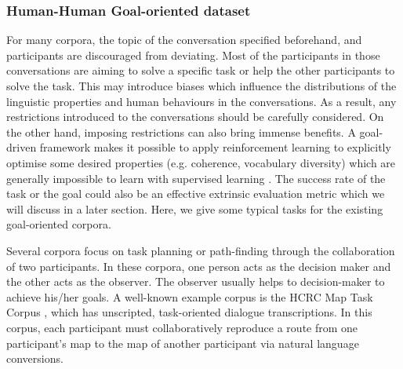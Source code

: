 \documentclass[bsc,frontabs,twoside,singlespacing,parskip,deptreport]{infthesis}     %
\begin{document}




\subsubsection*{Human-Human Goal-oriented dataset}

For many corpora, the topic of the conversation specified beforehand, and participants are discouraged from deviating. Most of the participants in those conversations are aiming to solve a specific task or help the other participants to solve the task. This may introduce biases which influence the distributions of the linguistic properties and human behaviours in the conversations. As a result, any restrictions introduced to the conversations should be carefully considered. On the other hand, imposing restrictions can also bring immense benefits. A goal-driven framework makes it possible to apply reinforcement learning to explicitly optimise some desired properties (e.g. coherence, vocabulary diversity) which are generally impossible to learn with supervised learning \cite{jurafsky2019speech}. The success rate of the task or the goal could also be an effective extrinsic evaluation metric which we will discuss in a later section. Here, we give some typical tasks for the existing goal-oriented corpora.

Several corpora focus on task planning or path-finding through the collaboration of two participants. In these corpora, one person acts as the decision maker and the other acts as the observer. The observer usually helps to decision-maker to achieve his/her goals. A well-known example corpus is the HCRC Map Task Corpus \cite{anderson1991hcrc}, which has unscripted, task-oriented dialogue transcriptions. In this corpus, each participant must collaboratively reproduce a route from one participant’s map to the map of another participant via natural language conversions. 
\end{document}
